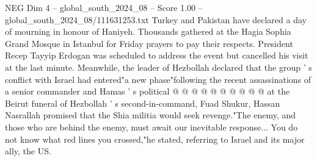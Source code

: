 \begin{textsample}{NEG Dim 4 – global\_south\_2024\_08 – Score 1.00 – global\_south\_2024\_08/111631253.txt}
Turkey and Pakistan have declared a day of mourning in honour of Haniyeh.
Thousands gathered at the Hagia Sophia Grand Mosque in Istanbul for Friday prayers to pay their respects.
President Recep Tayyip Erdogan was scheduled to address the event but cancelled his visit at the last minute.
Meanwhile, the leader of Hezbollah declared that the group ' s conflict with Israel had entered"a new phase"following the recent assassinations of a senior commander and Hamas ' s political @ @ @ @ @ @ @ @ @ @ at the Beirut funeral of Hezbollah ' s second-in-command, Fuad Shukur, Hassan Nasrallah promised that the Shia militia would seek revenge."The enemy, and those who are behind the enemy, must await our inevitable response...
You do not know what red lines you crossed,"he stated, referring to Israel and its major ally, the US.

\end{textsample}
